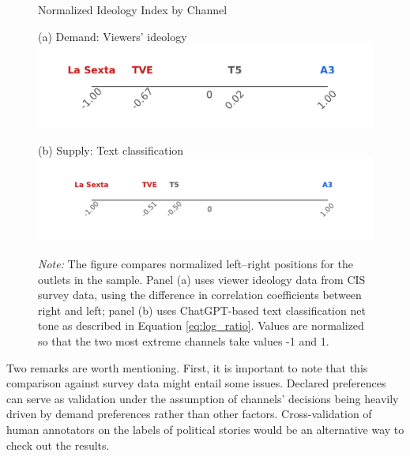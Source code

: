 \documentclass[12pt]{article}
\begin{document}
	\begin{figure}[!htbp]
	\centering
	\caption{Normalized Ideology Index by Channel}
	
	\begin{minipage}[t]{0.49\textwidth}
		\centering
		(a) Demand: Viewers' ideology
		\includegraphics[width=\linewidth]{figures/congress_line_cis}
	\end{minipage}
	\hfill
	\begin{minipage}[t]{0.49\textwidth}
		\centering
		
		
		(b) Supply: Text classification 
		\includegraphics[width=\linewidth]{figures/congress_line}
		

	\end{minipage}
	
	
	\caption*{\small \textit{Note:} The figure compares normalized left–right positions for the outlets in the sample. Panel (a) uses viewer ideology data from CIS survey data, using the difference in correlation coefficients between right and left; panel (b) uses ChatGPT-based text classification net tone as described in Equation \ref{eq:log_ratio}. Values are normalized so that the two most extreme channels take values -1 and 1. }
	\label{fig:congress_line}
\end{figure}




Two remarks are worth mentioning. First, it is important to note that this comparison against survey data might entail some issues. Declared preferences can serve as validation under the assumption of channels' decisions being heavily driven by demand preferences rather than other factors. Cross-validation of human annotators on the labels of political stories would be an alternative way to check out the results. 
\end{document}

